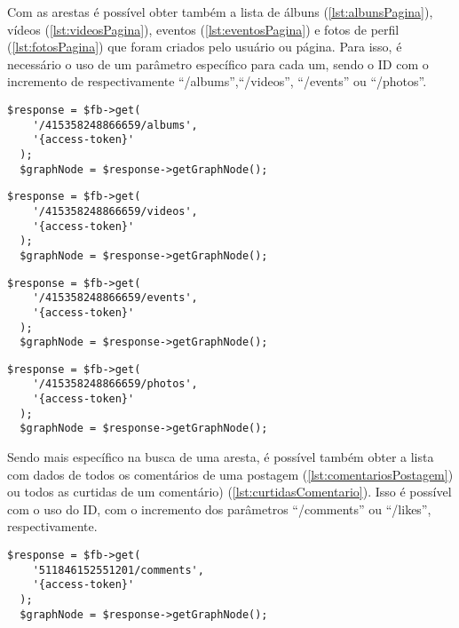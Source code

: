 Com as arestas é possível obter também a lista de álbuns (\ref{lst:albunsPagina}), vídeos (\ref{lst:videosPagina}), eventos (\ref{lst:eventosPagina}) e fotos de perfil (\ref{lst:fotosPagina}) que foram criados pelo usuário ou página. Para isso, é necessário o uso de um parâmetro específico para cada um, sendo o ID com o incremento de respectivamente ``/albums'',``/videos'', ``/events'' ou ``/photos''.
\begin{lstlisting}[caption={Requisitar todos os álbuns de uma página},label={lst:albunsPagina}]
  $response = $fb->get( 
    '/415358248866659/albums', 
    '{access-token}'
  );
  $graphNode = $response->getGraphNode();
\end{lstlisting}

\begin{lstlisting}[caption={Requisitar os vídeos publicados na página},label={lst:videosPagina}]
  $response = $fb->get( 
    '/415358248866659/videos', 
    '{access-token}'
  );
  $graphNode = $response->getGraphNode();
\end{lstlisting}

\begin{lstlisting}[caption={Requisitar os eventos agendados pela página},label={lst:eventosPagina}]
  $response = $fb->get( 
    '/415358248866659/events', 
    '{access-token}'
  );
  $graphNode = $response->getGraphNode();
\end{lstlisting}


\begin{lstlisting}[caption={Requisitar as fotos de perfil publicadas na página},label={lst:fotosPagina}]
  $response = $fb->get( 
    '/415358248866659/photos', 
    '{access-token}'
  );
  $graphNode = $response->getGraphNode();
\end{lstlisting}

Sendo mais específico na busca de uma aresta, é possível também obter a lista com dados de todos os comentários de uma postagem (\ref{lst:comentariosPostagem}) ou todos as curtidas de um comentário) (\ref{lst:curtidasComentario}). Isso é possível com o uso do ID, com o incremento dos parâmetros ``/comments'' ou ``/likes'', respectivamente.

\begin{lstlisting}[caption={Requisitar todos os comentários de uma postagem em uma página},label={lst:comentariosPostagem}]
  $response = $fb->get( 
    '511846152551201/comments', 
    '{access-token}'
  );
  $graphNode = $response->getGraphNode();
\end{lstlisting}

